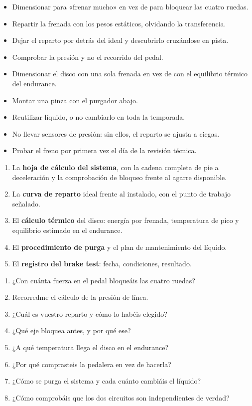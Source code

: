 \begin{ojo}
\begin{itemize}
  \item Dimensionar para «frenar mucho» en vez de para bloquear las cuatro
        ruedas.
  \item Repartir la frenada con los pesos estáticos, olvidando la transferencia.
  \item Dejar el reparto por detrás del ideal y descubrirlo cruzándose en pista.
  \item Comprobar la presión y no el recorrido del pedal.
  \item Dimensionar el disco con una sola frenada en vez de con el equilibrio
        térmico del endurance.
  \item Montar una pinza con el purgador abajo.
  \item Reutilizar líquido, o no cambiarlo en toda la temporada.
  \item No llevar sensores de presión: sin ellos, el reparto se ajusta a ciegas.
  \item Probar el freno por primera vez el día de la revisión técnica.
\end{itemize}
\end{ojo}

\begin{entregable}
\begin{enumerate}
  \item La \textbf{hoja de cálculo del sistema}, con la cadena completa de pie a
        deceleración y la comprobación de bloqueo frente al agarre disponible.
  \item La \textbf{curva de reparto} ideal frente al instalado, con el punto de
        trabajo señalado.
  \item El \textbf{cálculo térmico} del disco: energía por frenada, temperatura
        de pico y equilibrio estimado en el endurance.
  \item El \textbf{procedimiento de purga} y el plan de mantenimiento del
        líquido.
  \item El \textbf{registro del brake test}: fecha, condiciones, resultado.
\end{enumerate}
\end{entregable}

\begin{juez}
\begin{enumerate}
  \item ¿Con cuánta fuerza en el pedal bloqueáis las cuatro ruedas?
  \item Recorredme el cálculo de la presión de línea.
  \item ¿Cuál es vuestro reparto y cómo lo habéis elegido?
  \item ¿Qué eje bloquea antes, y por qué ese?
  \item ¿A qué temperatura llega el disco en el endurance?
  \item ¿Por qué comprasteis la pedalera en vez de hacerla?
  \item ¿Cómo se purga el sistema y cada cuánto cambiáis el líquido?
  \item ¿Cómo comprobáis que los dos circuitos son independientes de verdad?
\end{enumerate}
\end{juez}
